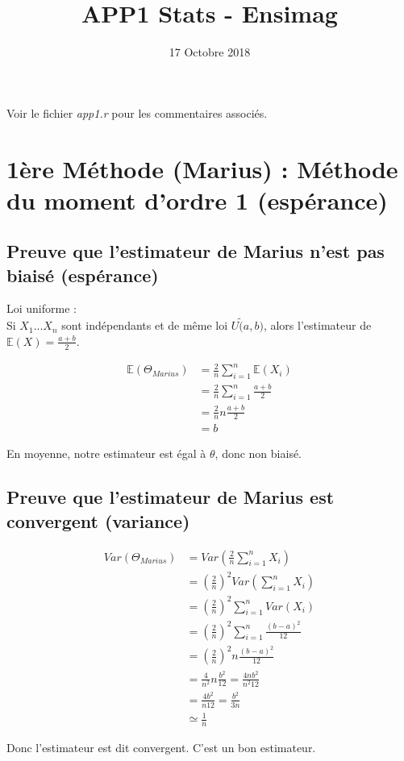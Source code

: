\documentclass{article}
\title{APP1 Stats - Ensimag}
\author{}
\date{17 Octobre 2018}
\begin{document}
        
\maketitle

Voir le fichier \textit{app1.r} pour les commentaires associés.

\section{1ère Méthode (Marius) : Méthode du moment d'ordre 1 (espérance)}

\subsection{Preuve que l'estimateur de Marius n'est pas biaisé (espérance)}

Loi uniforme :\\

Si $X_1...X_n$ sont indépendants et de même loi $U\tilde (a,b)$, alors l'estimateur de $\mathbb{E}(X)=\frac{a+b}{2}$.

\begin{equation}
    \begin{aligned}
        \mathbb{E}(\Theta_{Marius})&=\frac{2}{n}\sum_{i=1}^n \mathbb{E}(X_i)\\
        &=\frac{2}{n}\sum_{i=1}^n \frac{a+b}{2}\\
        &=\frac{2}{n}n\frac{a+b}{2}\\
        &=b
    \end{aligned}
\end{equation}

En moyenne, notre estimateur est égal à $\theta$, donc non biaisé.

\subsection{Preuve que l'estimateur de Marius est convergent (variance)}

\begin{equation}
    \begin{aligned}
        Var(\Theta_{Marius})&=Var(\frac{2}{n}\sum_{i=1}^n X_i)\\
        &=(\frac{2}{n})^2Var(\sum_{i=1}^n X_i)\\
        &=(\frac{2}{n})^2\sum_{i=1}^n Var(X_i)\\
        &=(\frac{2}{n})^2\sum_{i=1}^n \frac{(b-a)^2}{12}\\
        &=(\frac{2}{n})^2n\frac{(b-a)^2}{12}\\
        &=\frac{4}{n^2}n\frac{b^2}{12}=\frac{4nb^2}{n^2 12}\\
        &=\frac{4b^2}{n 12}=\frac{b^2}{3n}\\
        &\simeq \frac{1}{n}
    \end{aligned}
\end{equation}

Donc l'estimateur est dit convergent. C'est un bon estimateur.
\end{document}
